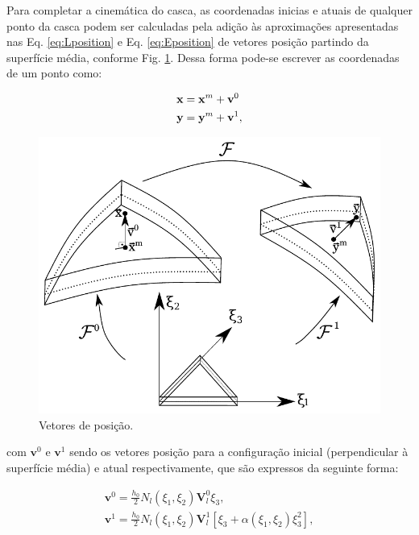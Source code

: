 \documentclass[tese_patricia]{subfiles}
\begin{document}
Para completar a cinemática do casca, as coordenadas inicias e atuais de qualquer ponto da casca podem ser calculadas pela adição às aproximações apresentadas nas Eq. \eqref{eq:Lposition} e Eq. \eqref{eq:Eposition} de vetores posição partindo da superfície média, conforme Fig. \ref{fig:casca2}. Dessa forma pode-se escrever as coordenadas de um ponto como:

\begin{align}
\mathbf{x} &= \mathbf{x}^{m} + \mathbf{v}^{0}\\
\mathbf{y} &= \mathbf{y}^{m} + \mathbf{v}^{1},
\end{align}

\begin{figure}[htb!]
	\centering
	\includegraphics[scale=0.8,trim=0cm 0.0cm 0cm 0cm, clip=true]{Imagens/Cap3/genvec.pdf}	
	\caption{Vetores de posição.}
	\label{fig:casca2}
\end{figure}

\noindent com $\mathbf{v}^{0}$ e $\mathbf{v}^{1}$ sendo os vetores posição para a configuração inicial (perpendicular à superfície média) e atual respectivamente, que são expressos da seguinte forma:

\begin{align}
\mathbf{v}^{0} = \frac{h_{0}}{2}N_{l}\left(\xi_{1},\xi_{2}\right)\mathbf{V}_{l}^{0}\xi_{3},\\
\mathbf{v}^{1} = \frac{h_{0}}{2}N_{l}\left(\xi_{1},\xi_{2}\right)\mathbf{V}_{l}^{1}\left[\xi_{3} + \alpha\left(\xi_{1},\xi_{2}\right)\xi_{3}^2\right],
\end{align}
\end{document}
